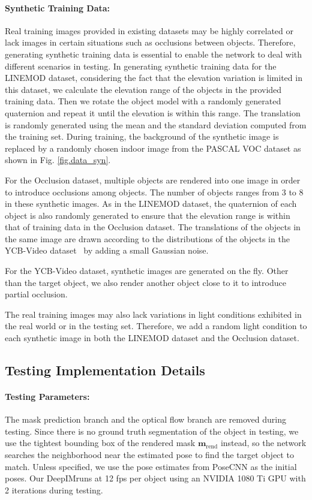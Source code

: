 \documentclass[twocolumn]{svjour3}
\newcommand{\dimnet}[0]{DeepIM}
\newcommand{\mrend}[0]{\mathbf{m}_{\text{rend}}}
\begin{document}
\paragraph{Synthetic Training Data:}
Real training images provided in existing datasets may be highly correlated or lack images in certain situations such as occlusions between objects. Therefore, generating synthetic training data is essential to enable the network to deal with different scenarios in testing. In generating synthetic training data for the LINEMOD dataset, considering the fact that the elevation variation is limited in this dataset, we calculate the elevation range of the objects in the provided training data. Then we rotate the object model with a randomly generated quaternion and repeat it until the elevation is within this range. The translation is randomly generated using the mean and the standard deviation computed from the training set. During training, the background of the synthetic image is replaced by a randomly chosen indoor image from the PASCAL VOC dataset as shown in Fig. \ref{fig.data_syn}.

For the Occlusion dataset, multiple objects are rendered into one image in order to introduce occlusions among objects. 
The number of objects ranges from 3 to 8 in these synthetic images. 
As in the LINEMOD dataset, the quaternion of each object is also randomly generated to ensure that the elevation range is within that of training data in the Occlusion dataset. 
The translations of the objects in the same image are drawn according to the distributions of the objects in the YCB-Video dataset~\citep{xiang2017posecnn} by adding a small Gaussian noise.

For the YCB-Video dataset, synthetic images are generated on the fly. Other than the target object, we also render another object close to it to introduce partial occlusion.

The real training images may also lack variations in light conditions exhibited in the real world or in the testing set. 
Therefore, we add a random light condition to each synthetic image in both the LINEMOD dataset and the Occlusion dataset.

\subsection{Testing Implementation Details} 
\paragraph{Testing Parameters:}
The mask prediction branch and the optical flow branch are removed during testing. Since there is no ground truth segmentation of the object in testing, we use the tightest bounding box of the rendered mask $\mrend$ instead, so the network searches the neighborhood near the estimated pose to find the target object to match. Unless specified, we use the pose estimates from PoseCNN \citep{xiang2017posecnn} as the initial poses. Our \dimnet\network runs at 12 fps per object using an NVIDIA 1080 Ti GPU with 2 iterations during testing.
\end{document}
